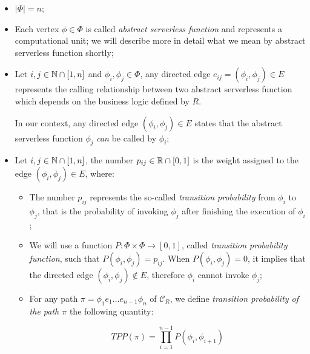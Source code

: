 \begin{itemize}
	\item $|\Phi| = n$;
	
	\item Each vertex $\phi \in \Phi$ is called \textit{abstract serverless function} and represents a computational unit; we will describe more in detail what we mean by abstract serverless function shortly;
	
	\item Let $i,j \in \mathbb{N} \cap \left[ 1, n \right]$ and $\phi_i, \phi_j \in \Phi$, any directed edge $e_{ij} = \left( \phi_i, \phi_j \right) \in E$ represents the calling relationship between two abstract serverless function which depends on the business logic defined by $R$. 
	
	In our context, any directed edge $\left( \phi_i, \phi_j \right) \in E$ states that the abstract serverless function $\phi_j$ \textit{can} be called by $\phi_i$;

	\item Let $i,j \in \mathbb{N} \cap \left[ 1, n \right]$, the number $p_{ij} \in \mathbb{R} \cap \left[ 0, 1 \right]$ is the weight assigned to the edge $\left(\phi_i, \phi_j \right) \in E$, where: 
	
	\begin{itemize}
		
		\item The number $p_{ij}$ represents the so-called \textit{transition probability} from $\phi_i$ to $\phi_j$, that is the probability of invoking $\phi_j$ after finishing the execution of $\phi_i$;
		
		\item We will use a function $P : \Phi \times \Phi \to \left[ 0, 1 \right]$, called \textit{transition probability function}, such that $P\left(\phi_i, \phi_j \right) = p_{ij}$. When $P\left(\phi_i, \phi_j \right) = 0$, it implies that the directed edge $\left( \phi_i, \phi_j \right) \notin E$, therefore $\phi_i$ cannot invoke $\phi_j$;
		
		\item For any path $\pi = \phi_1 e_1 \ldots e_{n-1} \phi_n$ of $\mathcal{C}_R$, we define \textit{transition probability of the path $\pi$} the following quantity:
		
		\begin{equation}
			TPP(\pi) = \prod_{i = 1}^{n-1} P\left(\phi_i, \phi_{i+1} \right)
		\end{equation}
		
	\end{itemize}
	

\end{itemize}
